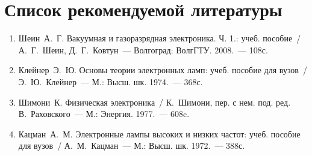 \section*{Список рекомендуемой литературы}
\vspace{-1.5em}
\begin{enumerate}
    \singlespacing
    \itemsep -.5pt
    \item Шеин~А.~Г. Вакуумная и газоразрядная электроника. Ч. 1.: учеб.
    пособие~/ А.~Г.~Шеин, Д.~Г.~Ковтун~--- Волгоград: ВолгГТУ. 2008.~--- 108с.
    \item Клейнер~Э.~Ю. Основы теории электронных ламп: учеб. пособие для
    вузов~/ Э.~Ю.~Клейнер~--- М.: Высш. шк. 1974.~--- 368с.
    \item Шимони~К. Физическая электроника~/ К.~Шимони, пер. с нем. под. ред.
    В.~Раховского~--- М.: Энергия. 1977.~--- 608c.
    \item Кацман~А.~М. Электронные лампы высоких и низких частот: учеб. пособие
    для вузов~/ А.~М.~Кацман~--- М.: Высш. шк. 1972.~--- 388с.
\end{enumerate}
